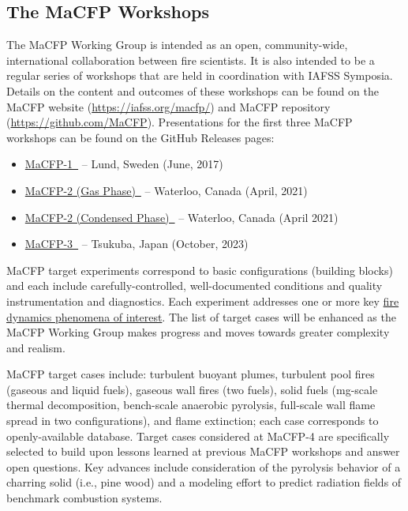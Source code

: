 \documentclass[12pt]{article}
\begin{document}
\subsection{The MaCFP Workshops}
The MaCFP Working Group is intended as an open, community-wide, international collaboration between fire scientists. It is also intended to be a regular series of workshops that are held in coordination with IAFSS Symposia. Details on the content and outcomes of these workshops can be found on the MaCFP website (\url{https://iafss.org/macfp/}) and MaCFP repository (\url{https://github.com/MaCFP}). Presentations for the first three MaCFP workshops can be found on the GitHub Releases pages:
\begin{itemize}[noitemsep]
 \item \href{https://github.com/MaCFP/macfp-db/releases/tag/macfp-1.0}{MaCFP-1~\cite{brown2018proceedings}} -- Lund, Sweden (June, 2017)
 \item \href{https://github.com/MaCFP/macfp-db/releases/tag/macfp-2.0}{MaCFP-2 (Gas Phase)~\cite{Ahmed2024Proceedings}} -- Waterloo, Canada (April, 2021)
 \item \href{https://github.com/MaCFP/matl-db/releases/tag/v1.1.0}{MaCFP-2 (Condensed Phase)~\cite{leventon2020preliminary}} -- Waterloo, Canada (April 2021)
  \item \href{https://github.com/MaCFP/macfp-db/releases/tag/macfp-3.0}{MaCFP-3~\cite{MaCFP3Proceedings}} -- Tsukuba, Japan (October, 2023)
\end{itemize}

MaCFP target experiments correspond to basic configurations (building blocks) and each include carefully-controlled, well-documented conditions and quality instrumentation and diagnostics. Each experiment addresses one or more key \href{https://github.com/MaCFP/macfp-db/blob/master/Documents/FIRE_PHENOMENA.md}{fire dynamics phenomena of interest}. The list of target cases will be enhanced as the MaCFP Working Group makes progress and moves towards greater complexity and realism.

MaCFP target cases include: turbulent buoyant plumes, turbulent pool fires (gaseous and liquid fuels), gaseous wall fires (two fuels), solid fuels (mg-scale thermal decomposition, bench-scale anaerobic pyrolysis, full-scale wall flame spread in two configurations), and flame extinction; each case corresponds to openly-available database.  Target cases considered at MaCFP-4 are specifically selected to build upon lessons learned at previous MaCFP workshops and answer open questions. Key advances include consideration of the pyrolysis behavior of a charring solid (i.e., pine wood) and a modeling effort to predict radiation fields of benchmark combustion systems.\\
\end{document}

